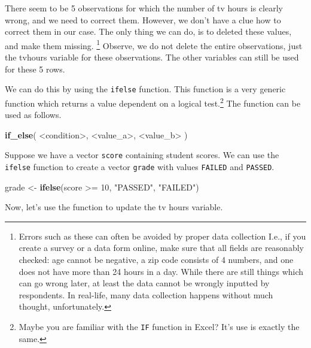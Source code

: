\documentclass[]{tufte-book}
\newenvironment{Shaded}{}{}
\newcommand{\DataTypeTok}[1]{\textcolor[rgb]{0.56,0.13,0.00}{#1}}
\newcommand{\DecValTok}[1]{\textcolor[rgb]{0.25,0.63,0.44}{#1}}
\newcommand{\KeywordTok}[1]{\textcolor[rgb]{0.00,0.44,0.13}{\textbf{#1}}}
\newcommand{\NormalTok}[1]{#1}
\newcommand{\OperatorTok}[1]{\textcolor[rgb]{0.40,0.40,0.40}{#1}}
\newcommand{\OtherTok}[1]{\textcolor[rgb]{0.00,0.44,0.13}{#1}}
\newcommand{\StringTok}[1]{\textcolor[rgb]{0.25,0.44,0.63}{#1}}
\begin{document}
There seem to be 5 observations for which the number of tv hours is clearly wrong, and we need to correct them. However, we don't have a clue how to correct them in our case. The only thing we can do, is to deleted these values, and make them missing. \footnote{Errors such as these can often be avoided by proper data collection I.e., if you create a survey or a data form online, make sure that all fields are reasonably checked: age cannot be negative, a zip code consists of 4 numbers, and one does not have more than 24 hours in a day. While there are still things which can go wrong later, at least the data cannot be wrongly inputted by respondents. In real-life, many data collection happens without much thought, unfortunately.} Observe, we do not delete the entire observations, just the tvhours variable for these observations. The other variables can still be used for these 5 rows.

We can do this by using the \texttt{ifelse} function. This function is a very generic function which returns a value dependent on a logical test.\footnote{Maybe you are familiar with the \texttt{IF} function in Excel? It's use is exactly the same.} The function can be used as follows.

\begin{Shaded}
\begin{Highlighting}[]
\KeywordTok{if_else}\NormalTok{( }\OperatorTok{<}\NormalTok{condition}\OperatorTok{>}\NormalTok{, }\OperatorTok{<}\NormalTok{value_a}\OperatorTok{>}\NormalTok{, }\OperatorTok{<}\NormalTok{value_b}\OperatorTok{>}\StringTok{ }\NormalTok{)}
\end{Highlighting}
\end{Shaded}

Suppose we have a vector \texttt{score} containing student scores. We can use the \texttt{ifelse} function to create a vector \texttt{grade} with values \texttt{FAILED} and \texttt{PASSED}.

\begin{Shaded}
\begin{Highlighting}[]
\NormalTok{grade <-}\StringTok{ }\KeywordTok{ifelse}\NormalTok{(score }\OperatorTok{>=}\StringTok{ }\DecValTok{10}\NormalTok{, }\StringTok{"PASSED"}\NormalTok{, }\StringTok{"FAILED"}\NormalTok{)}
\end{Highlighting}
\end{Shaded}

Now, let's use the function to update the tv hours variable.

\begin{Shaded}
\end{Shaded}
\end{document}
